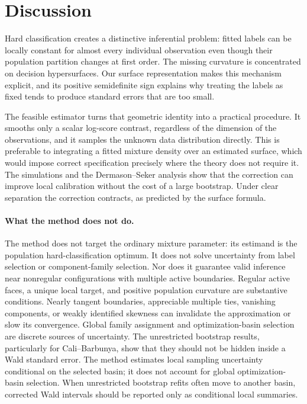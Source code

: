 \documentclass[numsec,webpdf,modern,medium,namedate]{oup-authoring-template}
\theoremstyle{plain}
\theoremstyle{definition}
\theoremstyle{remark}
\begin{document}
\section{Discussion}
\label{sec:discussion}
Hard classification creates a distinctive inferential problem: fitted labels
can be locally constant for almost every individual observation even though
their population partition changes at first order.  The missing curvature is
concentrated on decision hypersurfaces.  Our surface representation makes this
mechanism explicit, and its positive semidefinite sign explains why treating
the labels as fixed tends to produce standard errors that are too small.

The feasible estimator turns that geometric identity into a practical
procedure.  It smooths only a scalar log-score contrast, regardless of the
dimension of the observations, and it samples the unknown data distribution
directly.  This is preferable to integrating a fitted mixture density over an
estimated surface, which would impose correct specification precisely where
the theory does not require it.  The simulations and the Dermason--Seker
analysis show that the correction can improve local calibration without the
cost of a large bootstrap.  Under clear separation the correction contracts,
as predicted by the surface formula.

\paragraph{What the method does not do.}
The method does not target the ordinary mixture parameter: its estimand is the
population hard-classification optimum.  It does not solve uncertainty from
label selection or component-family selection.  Nor does it guarantee valid
inference near nonregular configurations with multiple active boundaries.
Regular active faces,
a unique local target, and positive population curvature are substantive
conditions.  Nearly tangent boundaries, appreciable multiple ties, vanishing
components, or weakly identified skewness can invalidate the approximation or
slow its convergence.  Global family assignment and optimization-basin
selection are discrete sources of uncertainty.  The unrestricted bootstrap
results, particularly for Cali--Barbunya, show that they should not be hidden
inside a Wald standard error.
The method estimates local sampling uncertainty conditional on the selected
basin; it does not account for global optimization-basin selection.  When
unrestricted bootstrap refits often move to another basin, corrected Wald
intervals should be reported only as conditional local summaries.
\end{document}
